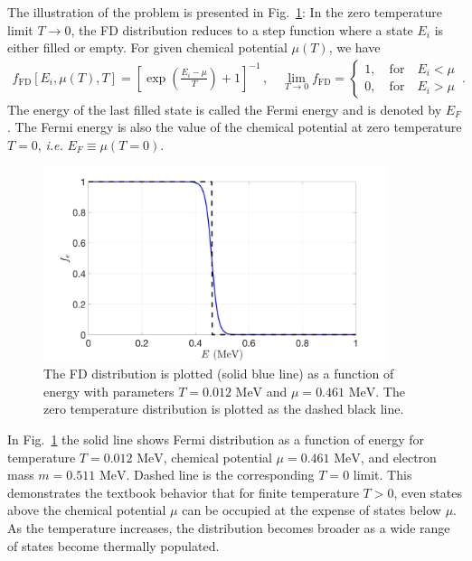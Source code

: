 \documentclass[sn-mathphys,Numbered]{sn-jnl}
\newcommand{\rf}[1]{Fig.~{\ref{#1}}}
\newcommand{\rsec}[1]{Sec.~{\ref{#1}}}
\newcommand*{\MeV}{\text{ MeV}}
\begin{document}

The illustration of the problem is presented in \rf{Electron_001}: In the zero temperature limit $T\to0$, the FD distribution reduces to a step function where a state $E_{i}$ is either filled or empty. For given chemical potential $\mu(T)$, we have
\begin{align}
\label{f_old}
f_\mathrm{FD}[E_{i},\mu(T),T]=\left[\exp\left(\frac{E_{i}-\mu}{T}\right)+1\right]^{-1}\,,\quad
\lim_{T\to0}f_\mathrm{FD}=\left\{
\begin{array}{c}
1,\quad\mathrm{for}\quad{E_{i}}<\mu\\
0,\quad\mathrm{for}\quad{E_{i}}>\mu
\end{array}
\right.\,.
\end{align}
The energy of the last filled state is called the Fermi energy and is denoted by $E_F$. The Fermi energy is also the value of the chemical potential at zero temperature $T=0$, \emph{i.e.} $E_F\equiv\mu(T = 0)$.
\begin{figure}[ht]
\centering
\includegraphics[width=0.9\textwidth]{./plot/Electron_distribution001}
\caption{The FD distribution is plotted (solid blue line) as a function of energy with parameters $T=0.012\MeV$ and $\mu=0.461\MeV$. The zero temperature distribution is plotted as the dashed black line.}
\label{Electron_001}
\end{figure}

In \rf{Electron_001} the solid line shows Fermi distribution as a function of energy for temperature $T=0.012\MeV$, chemical potential $\mu=0.461\MeV$, and electron mass $m=0.511\MeV$. Dashed line is the corresponding $T=0$ limit.  This demonstrates the textbook behavior that for finite temperature $T > 0$, even states above the chemical potential $\mu$ can be occupied at the expense of states below $\mu$. As the temperature increases, the distribution becomes broader as a wide range of states become thermally populated.
\end{document}

